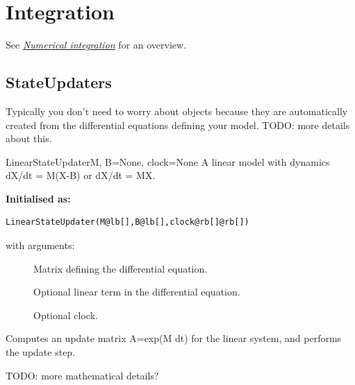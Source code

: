\documentclass[letterpaper,10pt]{manual}
\begin{document}
\resetcurrentobjects
{}

\hypertarget{integration}{}\section{Integration}

See \hyperlink{numerical-integration}{\emph{Numerical integration}} for an overview.


\subsection{StateUpdaters}

Typically you don't need to worry about  objects
because they are automatically created from the differential
equations defining your model. TODO: more details about this.

\hypertarget{brian.LinearStateUpdater}{}\begin{classdesc}{LinearStateUpdater}{M, B=None, clock=None}
A linear model with dynamics dX/dt = M(X-B) or dX/dt = MX.

\textbf{Initialised as:}

\begin{Verbatim}[commandchars=@\[\]]
LinearStateUpdater(M@lb[],B@lb[],clock@rb[]@rb[])
\end{Verbatim}

with arguments:
\begin{description}
\item[]
Matrix defining the differential equation.

\item[]
Optional linear term in the differential equation.

\item[]
Optional clock.

\end{description}

Computes an update matrix A=exp(M dt) for the linear system,
and performs the update step.

TODO: more mathematical details?
\end{classdesc}
\end{document}
